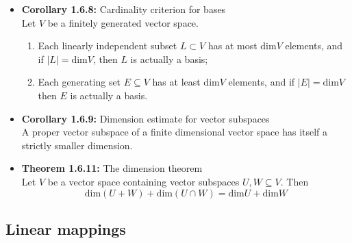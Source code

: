 \documentclass[11pt,a4paper]{article}
\begin{document}
\begin{itemize}
    \item \textbf{Corollary 1.6.8:} Cardinality criterion for bases \\
        Let $V$ be a finitely generated vector space.
        \begin{enumerate}
            \item Each linearly independent subset $L \subset V$ has at most dim$V$ elements,
                and if $|L| = \text{dim}V$, then $L$ is actually a basis;
            \item Each generating set $E \subseteq V$ has at least dim$V$ elements,
                and if $|E| = \text{dim}V$ then $E$ is actually a basis.
        \end{enumerate}

    \item \textbf{Corollary 1.6.9:} Dimension estimate for vector subspaces \\
        A proper vector subspace of a finite dimensional vector space has itself a strictly
        smaller dimension.

    \item \textbf{Theorem 1.6.11:} The dimension theorem \\
        Let $V$ be a vector space containing vector subspaces $U, W \subseteq V$.  Then
        \[
            \text{dim}(U+W) + \text{dim}(U \cap W) = \text{dim}U + \text{dim}W
        \]
\end{itemize}

\subsection{Linear mappings}
\end{document}
